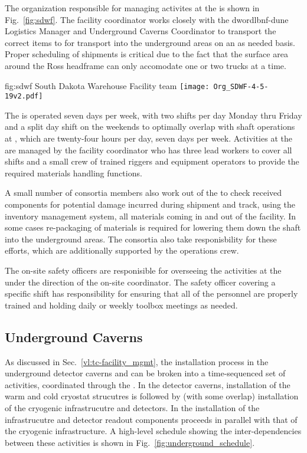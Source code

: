 The organization responsible for managing activites at the 
 is shown in Fig.~\ref{fig:sdwf}.  The facility 
coordinator works closely with the dword{lbnf-dune} Logistics 
Manager and Underground Caverns Coordinator to transport the 
correct items to  for transport into the underground
areas on an as needed basis.  Proper scheduling of shipments is 
critical due to the fact that the surface area around the Ross 
headframe can only accomodate one or two trucks at a time.   

\begin{dunefigure}{fig:sdwf}
  {South Dakota Warehouse Facility team}
  \texttt{[image: Org\_SDWF-4-5-19v2.pdf]}
\end{dunefigure}

The  is operated seven days per week, with two shifts 
per day Monday thru Friday and a split day shift on the weekends 
to optimally overlap with shaft operations at , which 
are twenty-four hours per day, seven days per week.  Activities at
the  are managed by the facility coordinator who has  
three lead workers to cover all shifts and a small crew of trained 
riggers and equipment operators to provide the required materials 
handling functions.  

A small number of  consortia members also work out of 
the  to check received components for potential damage 
incurred during shipment and track, using the inventory management 
system, all materials coming in and out of the facility.  In some 
cases re-packaging of materials is required for lowering them down
the shaft into the underground areas.  The  consortia
also take responisbility for these efforts, which are additionally
supported by the  operations crew.   

The on-site safety officers are responisible for overseeing the 
activities at the  under the direction of the on-site 
 coordinator.  The safety officer covering a specific 
shift has responsibility for ensuring that all of the 
personnel are properly trained and holding daily or weekly toolbox 
meetings as needed.

\subsection{Underground Caverns}

As discussed in Sec.~\ref{vl:tc-facility_mgmt}, the installation 
process in the underground detector caverns and  can 
be broken into a time-sequenced set of activities, coordinated 
through the .  In the detector caverns, installation 
of the warm and cold cryostat strucutres is followed by (with 
some overlap) installation of the cryogenic infrastrucutre and 
detectors.  In the  installation of the   
infrastrucutre and detector readout components proceeds in 
parallel with that of the cryogenic infrastructure.  A high-level 
schedule showing the inter-dependencies between these activities 
is shown in Fig.~\ref{fig:underground_schedule}.

